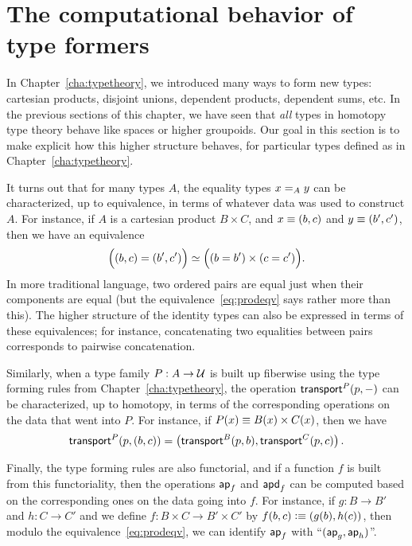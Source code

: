 \newcommand\ua{\ensuremath{\mathsf{ua}}}
\newcommand{\fcomp}{\circ}
\newcommand{\pairpath}{\ensuremath{\mathsf{pair}^{\mathord{=}}}\xspace}
\newcommand{\projpath}[1]{\ensuremath{\apfunc{\proj{#1}}}\xspace}

\section{The computational behavior of type formers}
\label{sec:computational}

In Chapter~\ref{cha:typetheory}, we introduced many ways to form new types: cartesian products, disjoint unions, dependent products, dependent sums, etc.
In the previous sections of this chapter, we have seen that \emph{all} types in homotopy type theory behave like spaces or higher groupoids.
Our goal in this section is to make explicit how this higher structure behaves, for particular types defined as in Chapter~\ref{cha:typetheory}.

It turns out that for many types $A$, the equality types $\id[A]xy$ can be characterized, up to equivalence, in terms of whatever data was used to construct $A$.
For instance, if $A$ is a cartesian product $B\times C$, and $x\jdeq (b,c)$ and $y\jdeq(b',c')$, then we have an equivalence
\begin{equation}\label{eq:prodeqv}
  \eqv{\Big((b,c)=(b',c')\Big)}{\Big((b=b')\times (c=c')\Big)}.
\end{equation}
In more traditional language, two ordered pairs are equal just when their components are equal (but the equivalence~\eqref{eq:prodeqv} says rather more than this).
The higher structure of the identity types can also be expressed in terms of these equivalences; for instance, concatenating two equalities between pairs corresponds to pairwise concatenation.

Similarly, when a type family $P:A\to\type$ is built up fiberwise using the type forming rules from Chapter~\ref{cha:typetheory}, the operation $\transfib{P}{p}{-}$ can be characterized, up to homotopy, in terms of the corresponding operations on the data that went into $P$.
For instance, if $P(x) \jdeq B(x)\times C(x)$, then we have
\[\transfib{P}{p}{(b,c)} = \left(\transfib{B}{p}{b},\transfib{C}{p}{c}\right).\]

Finally, the type forming rules are also functorial, and if a function $f$ is built from this functoriality, then the operations $\apfunc f$ and $\apdfunc f$ can be computed based on the corresponding ones on the data going into $f$.
For instance, if $g:B\to B'$ and $h:C\to C'$ and we define $f:B\times C \to B'\times C'$ by $f(b,c)\defeq (g(b),h(c))$, then modulo the equivalence~\eqref{eq:prodeqv}, we can identify $\apfunc f$ with ``$(\apfunc g,\apfunc h)$''.

